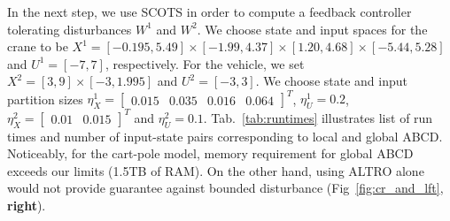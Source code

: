 In the next step, we use SCOTS in order to compute a feedback controller tolerating disturbances $W^1$ and $W^2$. %
We choose state and input spaces for the crane to be $X^{1}=[-0.195,5.49]\times[-1.99,4.37]\times[1.20,4.68]\times[-5.44,5.28]$ and $U^{1}=[-7,7]$, respectively. For the vehicle, we set $X^{2}=[3,9]\times[-3,1.995]$ and $U^{2}=[-3,3]$. %
We choose state and input partition sizes $\eta_{{X}}^{1}=\begin{bmatrix}0.015&0.035&0.016&0.064\end{bmatrix}^T$, $\eta_{U}^1=0.2$,  $\eta_{{X}}^2=\begin{bmatrix}0.01&0.015\end{bmatrix}^T$ and $\eta_{U}^2=0.1$. %
Tab.~\ref{tab:runtimes} illustrates list of run times and number of input-state pairs corresponding to local and global ABCD. Noticeably, for the cart-pole model, memory requirement for global ABCD exceeds our limits (1.5TB of RAM). On the other hand, using ALTRO alone would not provide guarantee against bounded disturbance (Fig~\ref{fig:cr_and_lft}, \textbf{right}). 

			


